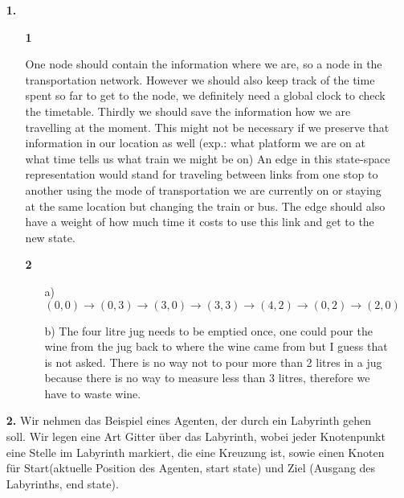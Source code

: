 \documentclass[a4paper,11pt]{article}
\author{\authorinfo}
\title{\titleinfo}
\date{\today}
\begin{document}
\maketitle
\begin{enumerate}
\item[\textbf{1.}]
    \begin{enumerate}
    \item[\textbf{1}]

        One node should contain the information where we are, so a node in the transportation network.
        However we should also keep track of the time spent so far to get to the node, we definitely need a
        global clock to check the timetable. Thirdly we should save the information how we are travelling at
        the moment. This might not be necessary if we preserve that information in our location as well
        (exp.: what platform we are on at what time tells us what train we might be on)
        An edge in this state-space representation would stand for traveling between links from one stop to
        another using the mode of transportation we are currently on or staying at the same location but
        changing the train or bus. The edge should also have a weight of how much time it costs to use this
        link and get to the new state.

    \item[\textbf{2}]
        \begin{enumerate}
        \item[a)]
            $(0,0) \rightarrow (0,3) \rightarrow (3,0) \rightarrow (3,3) \rightarrow (4,2) \rightarrow (0,2) \rightarrow (2,0)$

        \item[b)]
            The four litre jug needs to be emptied once, one could pour the wine from the jug back to
            where the wine came from but I guess that is not asked. There is no way not to pour more than 2
            litres in a jug because there is no way to measure less than 3 litres, therefore we have to waste wine.
        \end{enumerate}

    \end{enumerate}
\item[\textbf{2.}]
    Wir nehmen das Beispiel eines Agenten, der durch ein Labyrinth gehen soll.
    Wir legen eine Art Gitter über das Labyrinth, wobei jeder Knotenpunkt eine Stelle im Labyrinth markiert, die eine Kreuzung ist, sowie einen Knoten für Start(aktuelle Position des Agenten, start state) und Ziel (Ausgang des Labyrinths, end state).


\end{enumerate}
\end{document}
